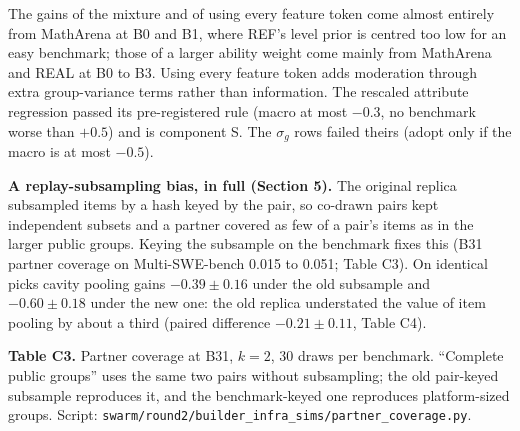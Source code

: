 \documentclass[
]{article}
\begin{document}
The gains of the mixture and of using every feature token come almost
entirely from MathArena at B0 and B1, where REF's level prior is centred
too low for an easy benchmark; those of a larger ability weight come
mainly from MathArena and REAL at B0 to B3. Using every feature token
adds moderation through extra group-variance terms rather than
information. The rescaled attribute regression passed its pre-registered
rule (macro at most \(-0.3\), no benchmark worse than \(+0.5\)) and is
component S. The \(\sigma_g\) rows failed theirs (adopt only if the
macro is at most \(-0.5\)).

\textbf{A replay-subsampling bias, in full (Section 5).} The original
replica subsampled items by a hash keyed by the pair, so co-drawn pairs
kept independent subsets and a partner covered as few of a pair's items
as in the larger public groups. Keying the subsample on the benchmark
fixes this (B31 partner coverage on Multi-SWE-bench 0.015 to 0.051;
Table C3). On identical picks cavity pooling gains \(-0.39 \pm 0.16\)
under the old subsample and \(-0.60 \pm 0.18\) under the new one: the
old replica understated the value of item pooling by about a third
(paired difference \(-0.21 \pm 0.11\), Table C4).

\textbf{Table C3.} Partner coverage at B31, \(k = 2\), 30 draws per
benchmark. ``Complete public groups'' uses the same two pairs without
subsampling; the old pair-keyed subsample reproduces it, and the
benchmark-keyed one reproduces platform-sized groups. Script:
\texttt{swarm/round2/builder\_infra\_sims/partner\_coverage.py}.
\end{document}
